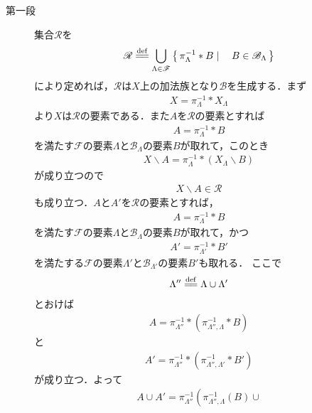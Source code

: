 	\begin{prf}\mbox{}
		\begin{description}
			\item[第一段]
				集合$\mathscr{R}$を
				\begin{align}
					\mathscr{R} \defeq \bigcup_{\Lambda\in\mathscr{F}} \Set{\pi_\Lambda^{-1} \ast B}{B \in \mathscr{B}_\Lambda}
				\end{align}
				により定めれば，$\mathscr{R}$は$X$上の加法族となり$\mathscr{B}$を生成する．まず
				\begin{align}
					X = \pi_\Lambda^{-1} \ast X_\Lambda
				\end{align}
				より$X$は$\mathscr{R}$の要素である．また$A$を$\mathscr{R}$の要素とすれば
				\begin{align}
					A = \pi_\Lambda^{-1} \ast B
				\end{align}
				を満たす$\mathscr{F}$の要素$\Lambda$と$\mathscr{B}_\Lambda$の要素$B$が取れて，このとき
				\begin{align}
					X \backslash A = \pi_\Lambda^{-1} \ast (X_\Lambda \backslash B)
				\end{align}
				が成り立つので
				\begin{align}
					X \backslash A \in \mathscr{R}
				\end{align}
				も成り立つ．$A$と$A'$を$\mathscr{R}$の要素とすれば，
				\begin{align}
					A = \pi_\Lambda^{-1} \ast B
				\end{align}
				を満たす$\mathscr{F}$の要素$\Lambda$と$\mathscr{B}_\Lambda$の要素$B$が取れて，かつ
				\begin{align}
					A' = \pi_{\Lambda'}^{-1} \ast B'
				\end{align}
				を満たする$\mathscr{F}$の要素$\Lambda'$と$\mathscr{B}_{\Lambda'}$の要素$B'$も取れる．
				ここで
				\begin{align}
					\Lambda'' \defeq \Lambda \cup \Lambda'
				\end{align}
				とおけば
				\begin{align}
					A = \pi_{\Lambda''}^{-1} \ast \left(\pi_{\Lambda'',\Lambda}^{-1} \ast B\right)
				\end{align}
				と
				\begin{align}
					A' = \pi_{\Lambda''}^{-1} \ast \left(\pi_{\Lambda'',\Lambda'}^{-1} \ast B'\right)
				\end{align}
				が成り立つ．よって
				\begin{align}
					A \cup A' =  \pi_{\Lambda''}^{-1}\left(\pi_{\Lambda'',\Lambda}^{-1}(B) \cup 

\end{align}
\end{description}
\end{prf}
